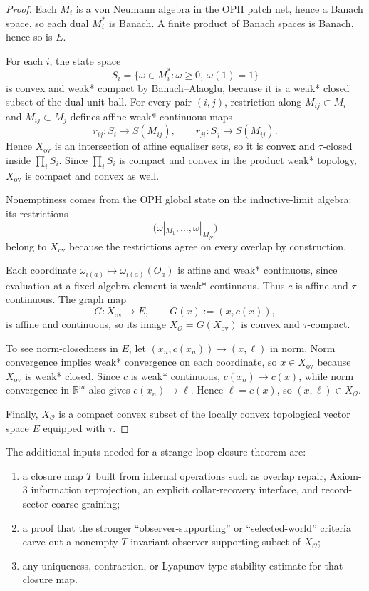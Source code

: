 \begin{proof}
Each \(M_i\) is a von Neumann algebra in the OPH patch net, hence a Banach space, so each dual
\(M_i^*\) is Banach. A finite product of Banach spaces is Banach, hence so is \(E\).

For each \(i\), the state space
\[
S_i=\{\omega\in M_i^*:\omega\ge 0,\ \omega(1)=1\}
\]
is convex and weak* compact by Banach--Alaoglu, because it is a weak* closed subset of the dual
unit ball. For every pair \((i,j)\), restriction along \(M_{ij}\subset M_i\) and
\(M_{ij}\subset M_j\) defines affine weak* continuous maps
\[
r_{ij}:S_i\to S(M_{ij}),
\qquad
r_{ji}:S_j\to S(M_{ij}).
\]
Hence \(X_{\mathrm{ov}}\) is an intersection of affine equalizer sets, so it is convex and
\(\tau\)-closed inside \(\prod_i S_i\). Since \(\prod_i S_i\) is compact and convex in the
product weak* topology, \(X_{\mathrm{ov}}\) is compact and convex as well.

Nonemptiness comes from the OPH global state on the inductive-limit algebra: its restrictions
\[
\bigl(\omega|_{M_1},\dots,\omega|_{M_N}\bigr)
\]
belong to \(X_{\mathrm{ov}}\) because the restrictions agree on every overlap by construction.

Each coordinate \(\omega_{i(a)}\mapsto \omega_{i(a)}(O_a)\) is affine and weak* continuous, since
evaluation at a fixed algebra element is weak* continuous. Thus \(c\) is affine and
\(\tau\)-continuous. The graph map
\[
G:X_{\mathrm{ov}}\to E,
\qquad
G(x):=(x,c(x)),
\]
is affine and continuous, so its image \(X_{\mathcal O}=G(X_{\mathrm{ov}})\) is convex and
\(\tau\)-compact.

To see norm-closedness in \(E\), let \((x_n,c(x_n))\to (x,\ell)\) in norm. Norm convergence
implies weak* convergence on each coordinate, so \(x\in X_{\mathrm{ov}}\) because
\(X_{\mathrm{ov}}\) is weak* closed. Since \(c\) is weak* continuous, \(c(x_n)\to c(x)\), while
norm convergence in \(\mathbb R^m\) also gives \(c(x_n)\to \ell\). Hence \(\ell=c(x)\), so
\((x,\ell)\in X_{\mathcal O}\).

Finally, \(X_{\mathcal O}\) is a compact convex subset of the locally convex topological vector
space \(E\) equipped with \(\tau\).
\end{proof}

The additional inputs needed for a strange-loop closure theorem are:
\begin{enumerate}
\item a closure map \(T\) built from internal operations such as overlap repair,
Axiom-3 information reprojection, an explicit collar-recovery interface, and
record-sector coarse-graining;
\item a proof that the stronger ``observer-supporting'' or ``selected-world'' criteria carve out a
nonempty \(T\)-invariant observer-supporting subset of \(X_{\mathcal O}\);
\item any uniqueness, contraction, or Lyapunov-type stability estimate for that closure map.
\end{enumerate}

